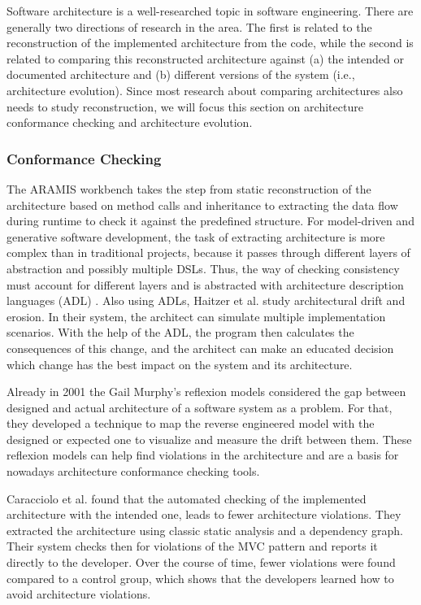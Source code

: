\documentclass[sigplan, anonymous, review]{acmart}
\begin{document}
Software architecture is a well-researched topic in software engineering.
There are generally two directions of research in the area.
The first is related to the reconstruction of the implemented architecture from the code, while the second is related to comparing this reconstructed architecture against (a) the intended or documented architecture and (b) different versions of the system (i.e., architecture evolution).
Since most research about comparing architectures also needs to study reconstruction, we will focus this section on architecture conformance checking and architecture evolution.

\subsubsection{Conformance Checking}

The ARAMIS workbench \cite{Aramis} takes the step from static reconstruction of the architecture based on method calls and inheritance to extracting the data flow during runtime to check it against the predefined structure. 
For model-driven and generative software development, the task of extracting architecture is more complex than in traditional projects, because it passes through different layers of abstraction and possibly multiple DSLs. 
Thus, the way of checking consistency must account for different layers and is abstracted with architecture description languages (ADL) \cite{ArcCons,Arc-MDSE}. 
Also using ADLs, Haitzer et al. \cite{Arc-Decision} study architectural drift and erosion. In their system, the architect can simulate multiple implementation scenarios. With the help of the ADL, the program then calculates the consequences of this change, and the architect can make an educated decision which change has the best impact on the system and its architecture. 

Already in 2001 the Gail Murphy's reflexion models \cite{MurphyRefl} considered the gap between designed and actual architecture of a software system as a problem. For that, they developed a technique to map the reverse engineered model with the designed or expected one to visualize and measure the drift between them. These reflexion models can help find violations in the architecture and are a basis for nowadays architecture conformance checking tools. 

Caracciolo et al. \cite{ArcConf} found that the automated checking of the implemented architecture with the intended one, leads to fewer architecture violations. They extracted the architecture using classic static analysis and a dependency graph. Their system checks then for violations of the MVC pattern and reports it directly to the developer. Over the course of time, fewer violations were found compared to a control group, which shows that the developers learned how to avoid architecture violations.
\end{document}
